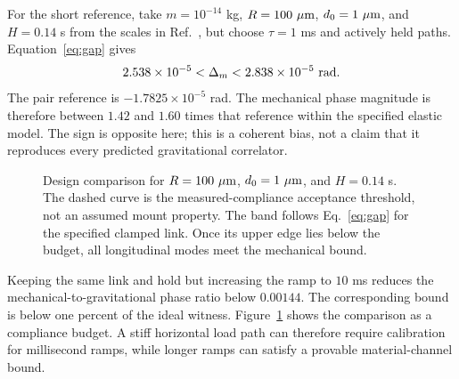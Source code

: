 \documentclass[aps,pra,reprint,amsmath,amssymb,longbibliography,floatfix]{revtex4-2}
\begin{document}
For the short reference, take $m=10^{-14}$ kg, $R=100\ \mu{\rm m}$, $d_0=1\ \mu{\rm m}$, and $H=0.14$ s from the scales in Ref.~\cite{Williams}, but choose $\tau=1$ ms and actively held paths. Equation~\eqref{eq:gap} gives
\begin{equation}
2.538\times10^{-5}<\Delta_m<2.838\times10^{-5}\ {\rm rad}.
\label{eq:shortinterval}
\end{equation}
The pair reference is $-1.7825\times10^{-5}$ rad. The mechanical phase magnitude is therefore between $1.42$ and $1.60$ times that reference within the specified elastic model. The sign is opposite here; this is a coherent bias, not a claim that it reproduces every predicted gravitational correlator.

\begin{figure}[t]
\centering
{}
\caption{Design comparison for $R=100\ \mu{\rm m}$, $d_0=1\ \mu{\rm m}$, and $H=0.14$ s. The dashed curve is the measured-compliance acceptance threshold, not an assumed mount property. The band follows Eq.~\eqref{eq:gap} for the specified clamped link. Once its upper edge lies below the budget, all longitudinal modes meet the mechanical bound.}
\label{fig:compliance}
\end{figure}

Keeping the same link and hold but increasing the ramp to $10$ ms reduces the mechanical-to-gravitational phase ratio below $0.00144$. The corresponding bound is below one percent of the ideal witness. Figure~\ref{fig:compliance} shows the comparison as a compliance budget. A stiff horizontal load path can therefore require calibration for millisecond ramps, while longer ramps can satisfy a provable material-channel bound.
\end{document}
